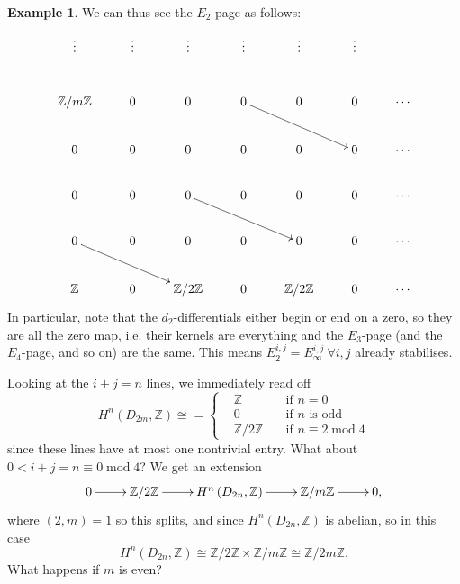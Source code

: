 \documentclass{article}
\newcommand{\Z}{\mathbb{Z}}
\newcommand{\Mod}{\operatorname{mod}}
\theoremstyle{definition}
\newtheorem{example}[defn]{Example}
\begin{document}
\begin{example}
We can thus see the $E_2$-page as follows:
\[
\xymatrix{
\vdots & \vdots & \vdots & \vdots & \vdots & \vdots \\
\Z/m\Z & 0 & 0 & 0\ar[rrd] & 0 & 0 & \cdots \\
0 & 0 & 0 & 0 & 0 & 0 & \cdots \\
0 & 0 & 0\ar[rrd] & 0 & 0 & 0 & \cdots \\
0\ar[rrd] & 0 & 0 & 0 & 0 & 0 & \cdots \\
\Z & 0 & \Z/2\Z & 0 & \Z/2\Z & 0 & \cdots
}
\]
In particular, note that the $d_2$-differentials either begin or end on a zero, so they are all the zero map, i.e. their kernels are everything and the $E_3$-page (and the $E_4$-page, and so on) are the same. This means $E_2^{i,j}=E_\infty^{i,j} \ \forall i,j$ already stabilises.

Looking at the $i+j=n$ lines, we immediately read off
\[
H^n\left(D_{2m},\Z\right)\cong=\left\{
\begin{aligned}
&\Z\quad&\text{if }n=0\\
&0\quad&\text{if }n\text{ is odd}\\
&\Z/2\Z\quad&\text{if }n\equiv 2\Mod 4
\end{aligned}
\right.
\]
since these lines have at most one nontrivial entry. What about $0<i+j=n\equiv 0\Mod 4$? We get an extension
\[
\xymatrix{
0\ar[r] & \Z/2\Z\ar[r] & H^n\left(D_{2n},\Z\right)\ar[r] & \Z/m\Z\ar[r] & 0,
}
\]
where $(2,m)=1$ so this splits, and since $H^n\left(D_{2n},\Z\right)$ is abelian, so in this case
\[
H^n\left(D_{2n},\Z\right)\cong\Z/2\Z\times\Z/m\Z\cong\Z/2m\Z.
\]
What happens if $m$ is even?
\end{example}
\end{document}
